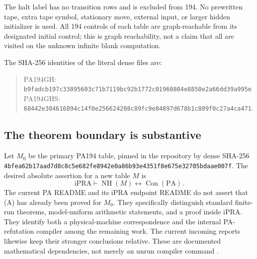 \documentclass[11pt,letterpaper]{article}
\newcommand{\PA}{\mathrm{PA}}
\newcommand{\iPRA}{\mathrm{iPRA}}
\newcommand{\Con}{\operatorname{Con}}
\newcommand{\NH}{\operatorname{NH}}
\begin{document}
The halt label has no transition rows and is excluded from 194. No prewritten
tape, extra tape symbol, stationary move, external input, or larger hidden
initializer is used. All 194 controls of each table are graph-reachable from
its designated initial control; this is graph reachability, not a claim
that all are visited on the unknown infinite blank computation.

The SHA-256 identities of the literal dense files are:
\begin{quote}\small
PA194GH: \nolinkurl{b9fadcb197c33895603c71b7119bc92b1772c01960804e8850e2a66dd39a995e}\\
PA194GHS: \nolinkurl{68442e304616894c14f0e256624208c89fc9e84897d678b1c809f0c27a4ca471}.
\end{quote}

\subsection{The theorem boundary is substantive}

Let $M_0$ be the primary PA194 table, pinned in the repository by dense
SHA-256 \nolinkurl{4bfea62b17aad7d8c8c5e682fe8942e0a86b93e4351f8e675e32705bdaae007f}.
The desired absolute assertion for a new table $M$ is
\[
             \iPRA\vdash \NH(M)\leftrightarrow\Con(\PA).
\tag{A}
\]
The current PA README and its iPRA endpoint README do not assert that (A)
has already been proved for $M_0$. They specifically distinguish standard
finite-run theorems, model-uniform arithmetic statements, and a proof inside
iPRA. They identify both a physical-machine correspondence and the internal
PA-refutation compiler among the remaining work. The current incoming
reports likewise keep their stronger conclusions relative. These are
documented mathematical dependencies, not merely an unrun compiler command
\cite{pa,endpoint}.
\end{document}
